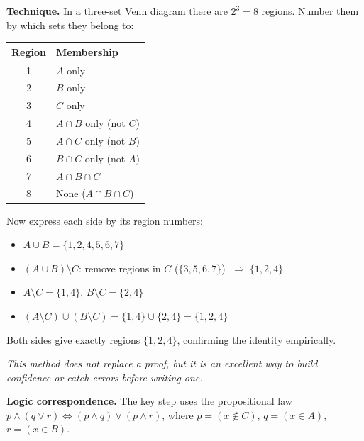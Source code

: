 \documentclass[12pt, a4paper]{article}
\newcommand{\comp}[1]{\overline{#1}}
\begin{document}
\medskip
\begin{tcolorbox}[colback=theoryBg, colframe=theoryFrame!80!black, arc=2mm, left=5pt, right=5pt, top=5pt, bottom=5pt, title={\small Region Numbering Method --- Empirical Verification}]
\textbf{Technique.}\; In a three-set Venn diagram there are $2^3 = 8$ regions.
Number them by which sets they belong to:

\begin{center}
\renewcommand{\arraystretch}{1.2}
\begin{tabular}{cl}
\toprule
\textbf{Region} & \textbf{Membership} \\
\midrule
1 & $A$ only \\
2 & $B$ only \\
3 & $C$ only \\
4 & $A \cap B$ only (not $C$) \\
5 & $A \cap C$ only (not $B$) \\
6 & $B \cap C$ only (not $A$) \\
7 & $A \cap B \cap C$ \\
8 & None ($\comp{A} \cap \comp{B} \cap \comp{C}$) \\
\bottomrule
\end{tabular}
\end{center}

Now express each side by its region numbers:
\begin{itemize}[nosep]
  \item $A \cup B = \{1, 2, 4, 5, 6, 7\}$
  \item $(A \cup B) \setminus C$: remove regions in $C$ ($\{3,5,6,7\}$)
        $\;\Longrightarrow\; \boxed{\{1, 2, 4\}}$
  \item $A \setminus C = \{1, 4\}$, \quad $B \setminus C = \{2, 4\}$
  \item $(A \setminus C) \cup (B \setminus C) = \{1, 4\} \cup \{2, 4\} = \boxed{\{1, 2, 4\}}$
\end{itemize}

Both sides give exactly regions $\{1, 2, 4\}$, confirming the identity empirically.

\medskip
\textit{This method does not replace a proof, but it is an excellent way to build confidence or catch errors before writing one.}
\end{tcolorbox}

\textbf{Logic correspondence.}\;
The key step uses the propositional law
$p \land (q \lor r) \iff (p \land q) \lor (p \land r)$,
where $p = (x \notin C)$,\; $q = (x \in A)$,\; $r = (x \in B)$.
\end{document}
